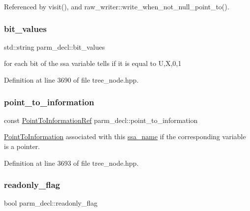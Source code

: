 Referenced by visit(), and raw\+\_\+writer\+::write\+\_\+when\+\_\+not\+\_\+null\+\_\+point\+\_\+to().

\mbox{\label{structparm__decl_af69dd2115bc8fcf211732bf350370b79}} 
\subsubsection{\texorpdfstring{bit\+\_\+values}{bit\_values}}
{\footnotesize\ttfamily std\+::string parm\+\_\+decl\+::bit\+\_\+values}



for each bit of the ssa variable tells if it is equal to U,X,0,1 



Definition at line 3690 of file tree\+\_\+node.\+hpp.

\mbox{\label{structparm__decl_a0fb2754b9177b42d4b12ba9276f2834c}} 
\subsubsection{\texorpdfstring{point\+\_\+to\+\_\+information}{point\_to\_information}}
{\footnotesize\ttfamily const \hyperlink{tree__node_8hpp_aa7470417b67a13b20fb980e600e55d8d}{Point\+To\+Information\+Ref} parm\+\_\+decl\+::point\+\_\+to\+\_\+information}



\hyperlink{structPointToInformation}{Point\+To\+Information} associated with this \hyperlink{structssa__name}{ssa\+\_\+name} if the corresponding variable is a pointer. 



Definition at line 3693 of file tree\+\_\+node.\+hpp.

\mbox{\label{structparm__decl_ae239b4279246ac83da186e10ff3914fd}} 
\subsubsection{\texorpdfstring{readonly\+\_\+flag}{readonly\_flag}}
{\footnotesize\ttfamily bool parm\+\_\+decl\+::readonly\+\_\+flag}



